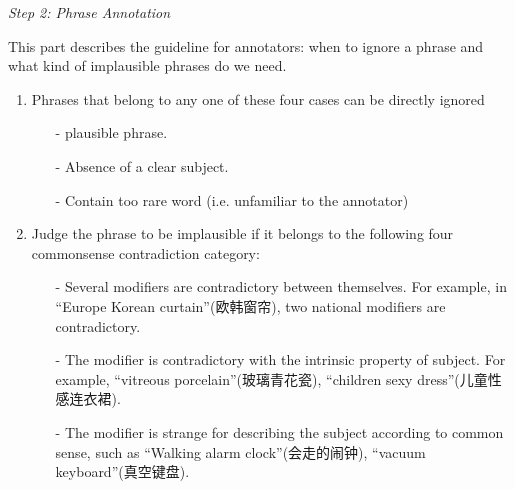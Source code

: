 
\textit{Step 2: Phrase Annotation}

This part describes the guideline for annotators: when to ignore a phrase and what kind of implausible phrases do we need. %
\begin{enumerate}
	\item Phrases that belong to any one of these four cases can be directly ignored%
	\begin{itemize}
		\item [-] plausible phrase. %
		\item [-] Absence of a clear subject.%
		\item [-] Contain too rare word (i.e. unfamiliar to the annotator)
	\end{itemize}
	\item Judge the phrase to be implausible if it belongs to the following four commonsense contradiction category:
	\begin{itemize}
		\item [-] Several modifiers are contradictory between themselves. %
		For example, in ``Europe Korean curtain''(欧韩窗帘), two national modifiers are contradictory.
		
		\item [-] The modifier is contradictory with the intrinsic property of subject. For example, ``vitreous porcelain''(玻璃青花瓷), %
		``children sexy dress''(儿童性感连衣裙).%
		
		\item [-] The modifier is strange for describing the subject %
		according to common sense, such as ``Walking alarm clock''(会走的闹钟), ``vacuum keyboard''(真空键盘).
	\end{itemize}
\end{enumerate}

